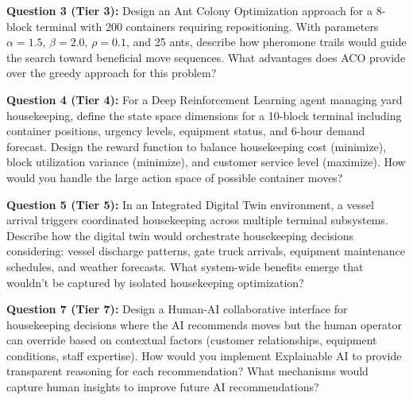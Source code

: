 \documentclass{article}
\begin{document}
\textbf{Question 3 (Tier 3):} Design an Ant Colony Optimization approach for a 8-block terminal with 200 containers requiring repositioning. With parameters $\alpha = 1.5$, $\beta = 2.0$, $\rho = 0.1$, and 25 ants, describe how pheromone trails would guide the search toward beneficial move sequences. What advantages does ACO provide over the greedy approach for this problem?

\textbf{Question 4 (Tier 4):} For a Deep Reinforcement Learning agent managing yard housekeeping, define the state space dimensions for a 10-block terminal including container positions, urgency levels, equipment status, and 6-hour demand forecast. Design the reward function to balance housekeeping cost (minimize), block utilization variance (minimize), and customer service level (maximize). How would you handle the large action space of possible container moves?

\textbf{Question 5 (Tier 5):} In an Integrated Digital Twin environment, a vessel arrival triggers coordinated housekeeping across multiple terminal subsystems. Describe how the digital twin would orchestrate housekeeping decisions considering: vessel discharge patterns, gate truck arrivals, equipment maintenance schedules, and weather forecasts. What system-wide benefits emerge that wouldn't be captured by isolated housekeeping optimization?

\textbf{Question 7 (Tier 7):} Design a Human-AI collaborative interface for housekeeping decisions where the AI recommends moves but the human operator can override based on contextual factors (customer relationships, equipment conditions, staff expertise). How would you implement Explainable AI to provide transparent reasoning for each recommendation? What mechanisms would capture human insights to improve future AI recommendations?
\end{document}
